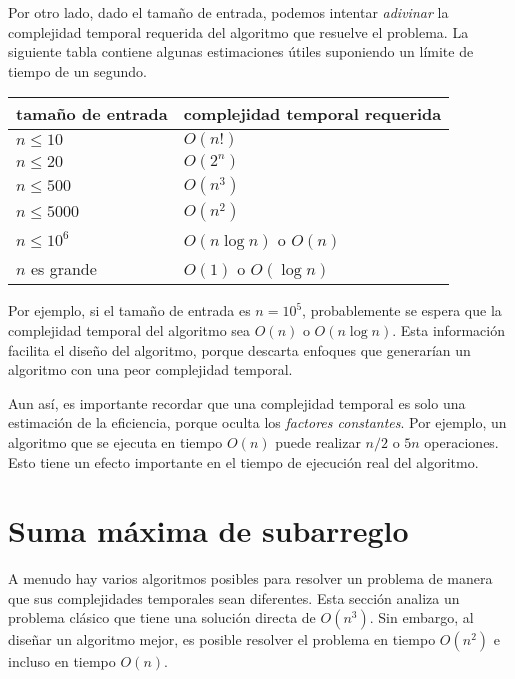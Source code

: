 Por otro lado, dado el tamaño de entrada,
podemos intentar \emph{adivinar}
la complejidad temporal requerida del algoritmo
que resuelve el problema.
La siguiente tabla contiene algunas estimaciones útiles
suponiendo un límite de tiempo de un segundo.

\begin{center}
\begin{tabular}{ll}
tamaño de entrada & complejidad temporal requerida \\
\hline
$n \le 10$ & $O(n!)$ \\
$n \le 20$ & $O(2^n)$ \\
$n \le 500$ & $O(n^3)$ \\
$n \le 5000$ & $O(n^2)$ \\
$n \le 10^6$ & $O(n \log n)$ o $O(n)$ \\
$n$ es grande & $O(1)$ o $O(\log n)$ \\
\end{tabular}
\end{center}

Por ejemplo, si el tamaño de entrada es $n=10^5$,
probablemente se espera que la complejidad
temporal del algoritmo sea $O(n)$ o $O(n \log n)$.
Esta información facilita el diseño del algoritmo,
porque descarta enfoques que generarían
un algoritmo con una peor complejidad temporal.


Aun así, es importante recordar que una
complejidad temporal es solo una estimación de la eficiencia,
porque oculta los \emph{factores constantes}.
Por ejemplo, un algoritmo que se ejecuta en tiempo $O(n)$
puede realizar $n/2$ o $5n$ operaciones.
Esto tiene un efecto importante en el tiempo de ejecución
real del algoritmo.

\section{Suma máxima de subarreglo}


A menudo hay varios algoritmos posibles
para resolver un problema de manera que sus
complejidades temporales sean diferentes.
Esta sección analiza un problema clásico que
tiene una solución directa de $O(n^3)$.
Sin embargo, al diseñar un algoritmo mejor, es
posible resolver el problema en tiempo $O(n^2)$
e incluso en tiempo $O(n)$.

